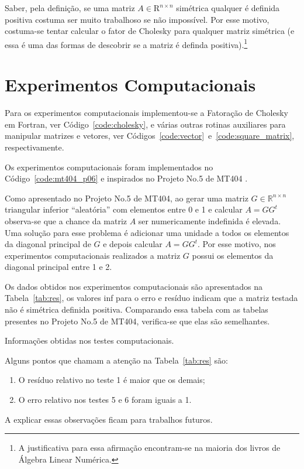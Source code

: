 \documentclass[12pt,a4paper]{article}
\begin{document}
Saber, pela definição, se uma matriz $A \in \mathrm{R}^{n \times n}$ simétrica
qualquer é definida positiva costuma ser muito trabalhoso se não impossível. Por
esse motivo, costuma-se tentar calcular o fator de Cholesky para qualquer matriz
simétrica (e essa é uma das formas de descobrir se a matriz é definda
positiva).\footnote{A justificativa para essa afirmação encontram-se na maioria
dos livros de Álgebra Linear Numérica.}

\section{Experimentos Computacionais}
Para os experimentos computacionais implementou-se a Fatoração de Cholesky em
Fortran, ver Código~\ref{code:cholesky}, e várias outras rotinas auxiliares para
manipular matrizes e vetores, ver
Códigos~\ref{code:vector}~e~\ref{code:square_matrix}, respectivamente.

Os experimentos computacionais foram implementados no
Código~\ref{code:mt404_p06} e inspirados no Projeto No.5 de MT404
\cite{Raniere-2012-MT404Proj05}.

Como apresentado no Projeto No.5 de MT404, ao gerar uma matriz $G \in
\mathbb{R}^{n \times n}$ triangular inferior ``aleatória'' com elementos entre 0
e 1 e calcular $A = G G^t$ observa-se que a chance da matriz $A$ ser
numericamente indefinida é elevada. Uma solução para esse problema é adicionar
uma unidade a todos os elementos da diagonal principal de $G$ e depois calcular
$A = G G^t$. Por esse motivo, nos experimentos computacionais realizados a
matriz $G$ possui os elementos da diagonal principal entre 1 e 2.

Os dados obtidos nos experimentos computacionais são apresentados na
Tabela~\ref{tab:res}, os valores inf para o erro e resíduo indicam que a matriz
testada não é simétrica definida positiva. Comparando essa tabela com as tabelas
presentes no Projeto No.5 de MT404, verifica-se que elas são semelhantes.
\begin{table}[!htb]
    \centering
    \caption{Informações obtidas nos testes computacionais.}
    \label{tab:res}
\end{table}

Alguns pontos que chamam a atenção na Tabela~\ref{tab:res} são:
\begin{enumerate}
    \item O resíduo relativo no teste 1 é maior que os demais;
    \item O erro relativo nos testes 5 e 6 foram iguais a 1.
\end{enumerate}
A explicar essas observações ficam para trabalhos futuros.
\end{document}
